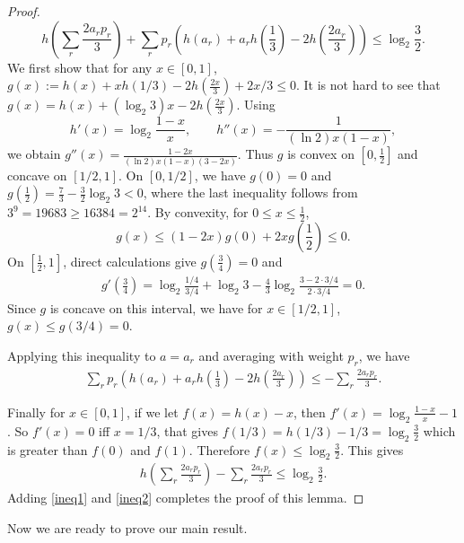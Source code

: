 \documentclass{article}
\begin{document}
\begin{proof}
$$h\left(\sum_r\frac{2a_rp_r}{3}\right)+\sum_r p_r \left(h(a_r)+a_rh\left(\frac{1}{3}\right)-2h\left(\frac{2a_r}{3}\right)\right) \le \log_2 \frac{3}{2}.$$
We first show that for any $x \in [0,1]$, $g(x):=h(x)+xh(1/3)-2h(\frac{2x}{3})+2x/3 \le 0$. It is not hard to see that $g(x)=h(x)+(\log_2 3) x-2h(\frac{2x}{3})$. Using
$$h'(x)=\log_2\frac{1-x}{x}, \qquad h''(x)=-\frac{1}{(\ln2)x(1-x)},$$
we obtain $g''(x)=\frac{1-2x}{(\ln2)x(1-x)(3-2x)}.$
Thus $g$ is convex on $[0,\frac{1}{2}]$ and concave on $[1/2,1]$. On $[0,1/2]$, we have $g(0)=0$ and $g\left(\frac12\right)
=\frac73-\frac32\log_2 3<0$,
where the last inequality follows from $3^9=19683 \ge 16384=2^{14}$. By convexity, for $0\le x\le  \frac{1}{2}$,
$$g(x)\le (1-2x)g(0)+2x g\left(\frac12\right)\le0.$$
On $[\frac{1}{2},1]$, direct calculations give $g\left(\frac34\right)=0$
and
\begin{align*}
g'\left(\frac34\right)=\log_2\frac{1/4}{3/4}+\log_2 3
-\frac43\log_2\frac{3-2 \cdot 3/4}{2 \cdot 3/4}=0.
\end{align*}
Since $g$ is concave on this interval, we have for $x \in [1/2, 1]$, $g(x) \le g(3/4) =0.$


Applying this inequality to $a=a_r$ and averaging with weight $p_r$, we have 
\begin{align} \label{ineq1}
\sum_r p_r\left(h(a_r)+a_rh\left(\frac{1}{3}\right)-2h\left(\frac{2a_r}{3}\right)\right) \le -\sum_r \frac{2a_rp_r}{3}.
\end{align}

Finally for $x \in [0,1]$, if we let $f(x)=h(x)-x$, then $f'(x)=\log_2 \frac{1-x}{x}-1$. So $f'(x)=0$ iff $x=1/3$, that gives $f(1/3)=h(1/3)-1/3=\log_2 \frac{3}{2}$ which is greater than $f(0)$ and $f(1)$. Therefore $f(x) \le \log_2 \frac{3}{2}.$ This gives
\begin{align}\label{ineq2}
h\left(\sum_r\frac{2a_rp_r}{3}\right) - \sum_r\frac{2a_rp_r}{3} \le \log_2 \frac{3}{2}.
\end{align}
Adding \eqref{ineq1} and \eqref{ineq2} completes the proof of this lemma.
\end{proof}


Now we are ready to prove our main result.
\end{document}
